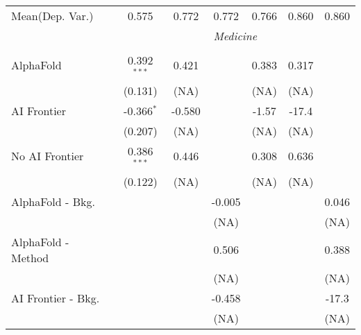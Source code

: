 \begin{tabular}{lcccccc}
Mean(Dep. Var.) & 0.575 & 0.772 & 0.772 & 0.766 & 0.860 & 0.860 \\
 & \multicolumn{6}{c}{\textit{Medicine}} \\ \\
   AlphaFold                                                                  & 0.392$^{***}$ & 0.421  &        & 0.383                  & 0.317                  &   \\   
                                                                              & (0.131)       & (NA)   &        & (NA)                   & (NA)                   &   \\   
   AI Frontier                                                                & -0.366$^{*}$  & -0.580 &        & -1.57                  & -17.4                  &   \\   
                                                                              & (0.207)       & (NA)   &        & (NA)                   & (NA)                   &   \\   
   No AI Frontier                                                             & 0.386$^{***}$ & 0.446  &        & 0.308                  & 0.636                  &   \\   
                                                                              & (0.122)       & (NA)   &        & (NA)                   & (NA)                   &   \\   
   AlphaFold - Bkg.                                                           &               &        & -0.005 &                        &                        & 0.046\\   
                                                                              &               &        & (NA)   &                        &                        & (NA)\\   
   AlphaFold - Method                                                         &               &        & 0.506  &                        &                        & 0.388\\   
                                                                              &               &        & (NA)   &                        &                        & (NA)\\   
   AI Frontier - Bkg.                                                         &               &        & -0.458 &                        &                        & -17.3\\   
                                                                              &               &        & (NA)   &                        &                        & (NA)\\   

\end{tabular}
